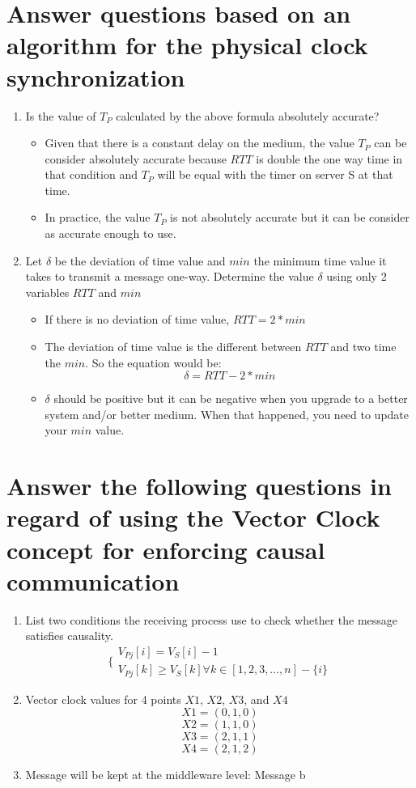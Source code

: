\documentclass[11pt,a4paper]{report}
\begin{document}
\section{Answer questions based on an algorithm for the physical clock synchronization}
\begin{enumerate}[label=\alph*)]
	\item Is the value of $T_P$ calculated by the above formula absolutely accurate?
	\begin{itemize}
		\item Given that there is a constant delay on the medium, the value $T_P$ can be consider absolutely accurate because $RTT$ is double the one way time in that condition and $T_P$ will be equal with the timer on server S at that time.
		\item In practice, the value $T_P$ is not absolutely accurate but it can be consider as accurate enough to use.
	\end{itemize}
	\item Let $\delta$ be the deviation of time value and $min$ the minimum time value it takes to transmit a message one-way. Determine the value $\delta$ using only 2 variables $RTT$ and $min$
	\begin{itemize}
		\item If there is no deviation of time value, $RTT = 2*min$
		\item The deviation of time value is the different between $RTT$ and two time the $min$. So the equation would be:
		\[\delta = RTT - 2*min\]
		\item $\delta$ should be positive but it can be negative when you upgrade to a better system and/or better medium. When that happened, you need to update your $min$ value. 
	\end{itemize}
\end{enumerate}

\section{Answer the following questions in regard of using the Vector Clock concept for enforcing causal communication}
\begin{enumerate}[label=\alph*)]
	\item List  two  conditions  the receiving process use to check whether the message satisfies causality.
	\[\bigg\{
	\begin{matrix}
		V_{Pj}[i] = V_S[i] - 1\\
		V_{Pj}[k] \geq V_S[k] \forall k \in [1, 2, 3, ..., n] - \{i\}
	\end{matrix}
	\]
	\item Vector clock values for 4 points $X1$, $X2$, $X3$, and $X4$
	\[X1 = (0,1,0)\]
	\[X2 = (1,1,0)\]
	\[X3 = (2,1,1)\]
	\[X4 = (2,1,2)\]
	\item Message will be kept at the middleware level:
	Message b
\end{enumerate}
\end{document}
